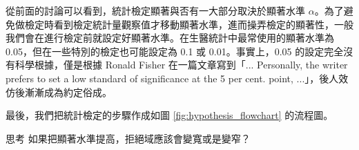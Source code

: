     從前面的討論可以看到，統計檢定顯著與否有一大部分取決於顯著水準 $\alpha$。為了避免做檢定時看到檢定統計量觀察值才移動顯著水準，進而操弄檢定的顯著性，一般我們會在進行檢定前就設定好顯著水準。在生醫統計中最常使用的顯著水準為 0.05，但在一些特別的檢定也可能設定為 0.1 或 0.01。事實上，0.05 的設定完全沒有科學根據，僅是根據 Ronald Fisher 在一篇文章寫到「... Personally, the writer prefers to set a low standard of significance at the 5 per cent. point, ...」，後人效仿後漸漸成為約定俗成。

    最後，我們把統計檢定的步驟作成如圖 \ref{fig:hypothesis_flowchart} 的流程圖。

    \bigskip

    \begin{custom}{思考}
       如果把顯著水準提高，拒絕域應該會變寬或是變窄？
    \end{custom}


